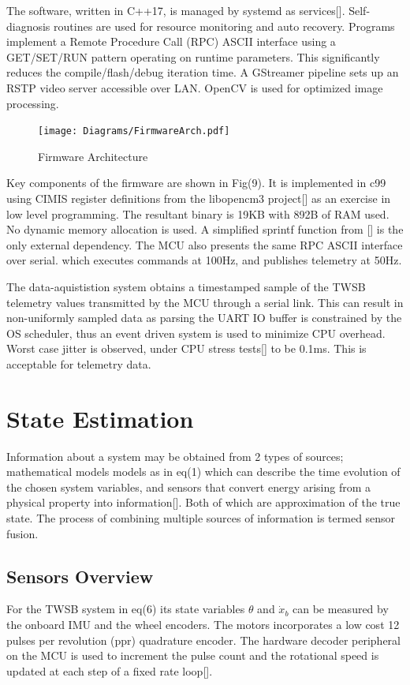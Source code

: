         The software, written in C++17, is managed by systemd as services[]. 
        Self-diagnosis routines are used for resource monitoring and auto recovery. 
        Programs implement a Remote Procedure Call (RPC) ASCII interface using 
        a GET/SET/RUN pattern operating on runtime parameters. 
        This significantly reduces the compile/flash/debug iteration time. 
        A GStreamer pipeline sets up an RSTP video server accessible over LAN.
        OpenCV is used for optimized image processing.
        \begin{figure} [H]
            \texttt{[image: Diagrams/FirmwareArch.pdf]}
            \caption{Firmware Architecture}
        \end{figure}

        Key components of the firmware are shown in Fig(9).
        It is implemented in c99 using CIMIS register definitions from the 
        libopencm3 project[] as an exercise in low level programming. 
        The resultant binary is 19KB with 892B of RAM used.
        No dynamic memory allocation is used.
        A simplified sprintf function from [] is the only external dependency.
        The MCU also presents the same RPC ASCII interface over serial.
        which executes commands at 100Hz, and publishes telemetry at 50Hz.

        The data-aquististion system obtains a timestamped sample of the TWSB 
        telemetry values transmitted by the MCU through a serial link.
        This can result in non-uniformly sampled data as parsing the UART IO buffer 
        is constrained by the OS scheduler, thus an event driven system is used to minimize CPU overhead.   
        Worst case jitter is observed, under CPU stress tests[] to be 0.1ms. 
        This is acceptable for telemetry data. 
        \pagebreak{}
    \section{State Estimation}
    Information about a system may be obtained from 2 types of sources; 
    mathematical models models as in eq(1) which can describe the time evolution of the chosen system variables, 
    and sensors that convert energy arising from a physical property into information[]. Both of which are approximation of the true state. 
    The process of combining multiple sources of information is termed sensor fusion.

    \subsection{Sensors Overview}
        For the TWSB system in eq(6) its state variables $\theta$ and $\dot x_b$ can be measured by the onboard IMU and the wheel encoders.
        The motors incorporates a low cost 12 pulses per revolution (ppr) quadrature encoder. The hardware decoder peripheral on the MCU
        is used to increment the pulse count and the rotational speed is updated at each step of a fixed rate loop[].
        
